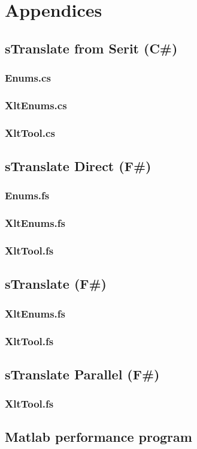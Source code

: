 \documentclass[12pt, a4paper]{article}
\begin{document}
\appendix
\footnotesize
\section{Appendices}	
\subsection{sTranslate from Serit (C\#)}
\subsubsection{Enums.cs}

\newpage
\subsubsection{XltEnums.cs}

\newpage
\subsubsection{XltTool.cs}


\newpage
\subsection{sTranslate Direct (F\#)}
\subsubsection{Enums.fs}

\newpage
\subsubsection{XltEnums.fs}

\newpage
\subsubsection{XltTool.fs}


\newpage
\subsection{sTranslate (F\#)}
\subsubsection{XltEnums.fs}

\newpage
\subsubsection{XltTool.fs}


\newpage
\subsection{sTranslate Parallel (F\#)}
\subsubsection{XltTool.fs}


\newpage
\subsection{Matlab performance program}

\end{document}
